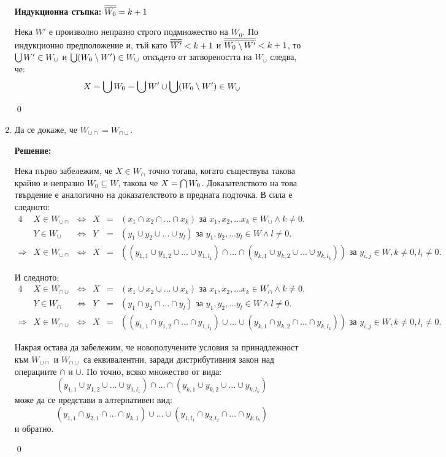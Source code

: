 \begin{problem}
\begin{enumerate}
\textbf{Индукционна стъпка:} $\overline{\overline{W_0}} = k+1$

Нека $W'$ е произволно непразно строго подмножество на $W_0$.
По индукционно предположение и, тъй като $\overline{\overline{W'}} < k+1$ и $\overline{\overline{W_0 \setminus W'}} < k+1$, то
$\bigcup W' \in W_{\cup}$ и
$\bigcup (W_0 \setminus W') \in W_{\cup}$
откъдето от затвореността на $W_{\cup}$ следва, че:
\[
X = \bigcup W_0 = \bigcup W' \cup \bigcup (W_0 \setminus W') \in W_{\cup}
\]

\qed


\item
Да се докаже, че $W_{\cup \cap} = W_{\cap \cup}$.

\textbf{Решение:}

\smallbreak
\quad
Нека първо забележим, че $X \in W_{\cap}$ точно тогава, когато съществува такова крайно и непразно $W_0 \subseteq W$, такова че $X = \bigcap{W_0}$.
Доказателството на това твърдение е аналогично на доказателството в предната подточка. В сила е следното:
\begin{alignat*}{4}
&X \in W_{\cup \cap} & \iff & X &{} = {}& (x_1 \cap x_2 \cap \dots \cap x_k) \text{ за } x_1, x_2, \dots x_k \in W_{\cup} \land k \neq 0. \\
&Y \in W_{\cup}      & \iff & Y &{} = {}& (y_1 \cup y_2 \cup \dots \cup y_l) \text{ за } y_1, y_2, \dots y_l \in W \land l \neq 0. \\
\hline
\Rightarrow {}
&X \in W_{\cup \cap} & \iff & X &{} = {}& ((y_{1,1} \cup y_{1,2} \cup \dots \cup y_{1,l_1}) \cap \dots \cap (y_{k,1} \cup y_{k,2} \cup \dots \cup y_{k,l_k}))
\text{ за } y_{i, j} \in W, k \neq 0, l_i \neq 0.
\end{alignat*}

\quad
И следното:
\begin{alignat*}{4}
&X \in W_{\cap \cup} & \iff & X &{} = {}& (x_1 \cup x_2 \cup \dots \cup x_k) \text{ за } x_1, x_2, \dots x_k \in W_{\cap} \land k \neq 0. \\
&Y \in W_{\cap}      & \iff & Y &{} = {}& (y_1 \cap y_2 \cap \dots \cap y_l) \text{ за } y_1, y_2, \dots y_l \in W \land l \neq 0. \\
\hline
\Rightarrow {}
&X \in W_{\cap \cup} & \iff & X &{} = {}& ((y_{1,1} \cap y_{1,2} \cap \dots \cap y_{1,l_1}) \cup \dots \cup (y_{k,1} \cap y_{k,2} \cap \dots \cap y_{k,l_k}))
\text{ за } y_{i,j} \in W, k \neq 0, l_i \neq 0.
\end{alignat*}

\quad
Накрая остава да забележим, че новополучените условия за принадлежност към $W_{\cup \cap}$ и $W_{\cap \cup}$ са еквивалентни,
заради дистрибутивния закон над операциите $\cap$ и $\cup$. По точно, всяко множество от вида:
\[
(y_{1,1} \cup y_{1,2} \cup \dots \cup y_{1,l_1}) \cap \dots \cap (y_{k,1} \cup y_{k,2} \cup \dots \cup y_{k,l_k})
\]
\quad
може да се представи в алтернативен вид:
\[
(y_{1,1} \cap y_{2,1} \cap \dots \cap y_{k,1}) \cup \dots \cup (y_{1,l_1} \cap y_{2,l_2} \cap \dots \cap y_{k,l_k})
\]
\quad
и обратно.

\qed

\end{enumerate}
\end{problem}
